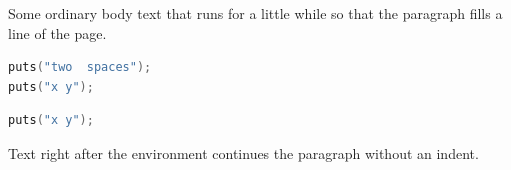 \documentclass{article}
\begin{document}
Some ordinary body text that runs for a little while so that the paragraph fills a line of the page.
\begin{lstlisting}[language=C,basicstyle=\ttfamily]
puts("two  spaces");
puts("x y");
\end{lstlisting}
\begin{lstlisting}[language=C,basicstyle=\ttfamily,showstringspaces=false]
puts("x y");
\end{lstlisting}
Text right after the environment continues the paragraph without an indent.
\end{document}
